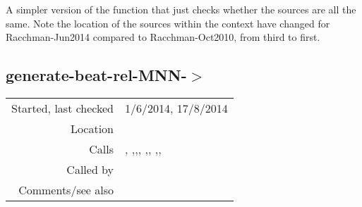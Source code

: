 \noindent A simpler version of the function
 that just checks whether the
sources are all the same. Note the location of the
sources within the context have changed for
Racchman-Jun2014 compared to Racchman-Oct2010, from
third to first.


\subsection*{generate-beat-rel-MNN-$>$}\label{fun:generate-beat-rel-MNN->}

\vspace{0.3cm}
\begin{tabular}{r|p{8cm}}
Started, last checked & 1/6/2014, 17/8/2014 \\
Location & \nameref{sec:generating-beat-relative-MNN} \\
Calls & \nameref{fun:checklistp-rel}, \nameref{fun:choose-one},\newline \nameref{fun:choose-one-with-beat},\newline \nameref{fun:index-1st-sublist-item>=}, \nameref{fun:my-last},\newline \nameref{fun:segments-strict}, \nameref{fun:sort-dataset-asc},\newline \nameref{fun:states2datapoints-by-rel},\newline \nameref{fun:translate-datapoints-to-first-ontime} \\
Called by & \\
Comments/see also & \nameref{fun:generate-beat-MNN-spacing->}
\end{tabular}

